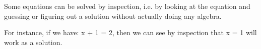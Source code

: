 Some equations can be solved by inspection, i.e. by
looking at the equation and guessing or figuring
out a solution without actually doing any algebra.
\par
For instance, if we have:
x + 1 = 2,
then we can see by inspection that x = 1 will work
as a solution.